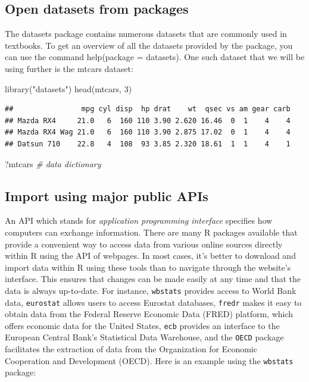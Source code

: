 \documentclass[
  12pt,
  oneside]{book}
\newenvironment{Shaded}{\begin{snugshade}}{\end{snugshade}}
\newcommand{\CommentTok}[1]{\textcolor[rgb]{0.56,0.35,0.01}{\textit{#1}}}
\newcommand{\DecValTok}[1]{\textcolor[rgb]{0.00,0.00,0.81}{#1}}
\newcommand{\FunctionTok}[1]{\textcolor[rgb]{0.00,0.00,0.00}{#1}}
\newcommand{\NormalTok}[1]{#1}
\newcommand{\StringTok}[1]{\textcolor[rgb]{0.31,0.60,0.02}{#1}}
\theoremstyle{definition}
\theoremstyle{definition}
\theoremstyle{definition}
\theoremstyle{definition}
\theoremstyle{remark}
\begin{document}
\hypertarget{open-datasets-from-packages}{%
\subsection{Open datasets from packages}\label{open-datasets-from-packages}}

The datasets package contains numerous datasets that are commonly used in textbooks.
To get an overview of all the datasets provided by the package, you can use the command help(package = datasets).
One such dataset that we will be using further is the mtcars dataset:

\begin{Shaded}
\begin{Highlighting}[]
\FunctionTok{library}\NormalTok{(}\StringTok{"datasets"}\NormalTok{)}
\FunctionTok{head}\NormalTok{(mtcars, }\DecValTok{3}\NormalTok{)}
\end{Highlighting}
\end{Shaded}

\begin{verbatim}
##                mpg cyl disp  hp drat    wt  qsec vs am gear carb
## Mazda RX4     21.0   6  160 110 3.90 2.620 16.46  0  1    4    4
## Mazda RX4 Wag 21.0   6  160 110 3.90 2.875 17.02  0  1    4    4
## Datsun 710    22.8   4  108  93 3.85 2.320 18.61  1  1    4    1
\end{verbatim}

\begin{Shaded}
\begin{Highlighting}[]
\NormalTok{?mtcars  }\CommentTok{\# data dictionary}
\end{Highlighting}
\end{Shaded}

\hypertarget{import-using-major-public-apis}{%
\subsection{Import using major public APIs}\label{import-using-major-public-apis}}

An API which stands for \emph{application programming interface} specifies how computers can exchange information. There are many R packages available that provide a convenient way to access data from various online sources directly within R using the API of webpages. In most cases, it's better to download and import data within R using these tools than to navigate through the website's interface. This ensures that changes can be made easily at any time and that the data is always up-to-date. For instance, \texttt{wbstats} provides access to World Bank data, \texttt{eurostat} allows users to access Eurostat databases, \texttt{fredr} makes it easy to obtain data from the Federal Reserve Economic Data (FRED) platform, which offers economic data for the United States, \texttt{ecb} provides an interface to the European Central Bank's Statistical Data Warehouse, and the \texttt{OECD} package facilitates the extraction of data from the Organization for Economic Cooperation and Development (OECD). Here is an example using the \texttt{wbstats} package:
\end{document}
